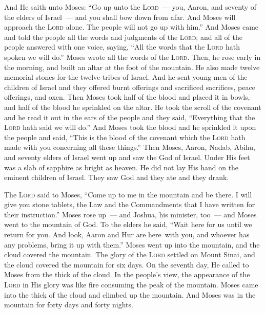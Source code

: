 
\begin{inparaenum}
   And He saith unto Moses: ``Go up unto the \textsc{Lord}~--- you, Aaron, and seventy of the elders of Israel~--- and you shall bow down from afar.%
   And Moses will approach the \textsc{Lord} alone. The people will not go up with him.''%
   And Moses came and told the people all the words and judgments of the \textsc{Lord}; and all of the people answered with one voice, saying, ``All the words that the \textsc{Lord} hath spoken we will do.''%
   Moses wrote all the words of the \textsc{Lord}. Then, he rose early in the morning, and built an altar at the foot of the mountain. He also made twelve memorial stones for the twelve tribes of Israel.%
   And he sent young men of the children of Israel and they offered burnt offerings and sacrificed sacrifices, peace offerings, and oxen.%
   Then Moses took half of the blood and placed it in bowls, and half of the blood he sprinkled on the altar.%
   He took the scroll of the covenant and he read it out in the ears of the people and they said, ``Everything that the \textsc{Lord} hath said we will do.''%
   And Moses took the blood and he sprinkled it upon the people and said, ``This is the blood of the covenant which the \textsc{Lord} hath made with you concerning all these things.''%
   Then Moses, Aaron, Nadab, Abihu, and seventy elders of Israel went up%
   and saw the God of Israel. Under His feet was a slab of sapphire as bright as heaven.%
   He did not lay His hand on the eminent children of Israel. They saw God and they ate and they drank.%
  
   The \textsc{Lord} said to Moses, ``Come up to me in the mountain and be there. I will give you stone tablets, the Law and the Commandments that I have written for their instruction.''%
   Moses rose up~--- and Joshua, his minister, too~--- and Moses went to the mountain of God.%
   To the elders he said, ``Wait here for us until we return for you. And look, Aaron and Hur are here\understood\ with you, and whoever has any problems, bring it up with them.''%
   Moses went up into the mountain, and the cloud covered the mountain.%
   The glory of the \textsc{Lord} settled on Mount Sinai, and the cloud covered the mountain for six days. On the seventh day, He called to Moses from the thick of the cloud.%
   In the people's view, the appearance of the \textsc{Lord} in His glory was like fire consuming the peak of the mountain.%
   Moses came into the thick of the cloud and climbed up the mountain. And Moses was in the mountain for forty days and forty nights.%
\end{inparaenum}
